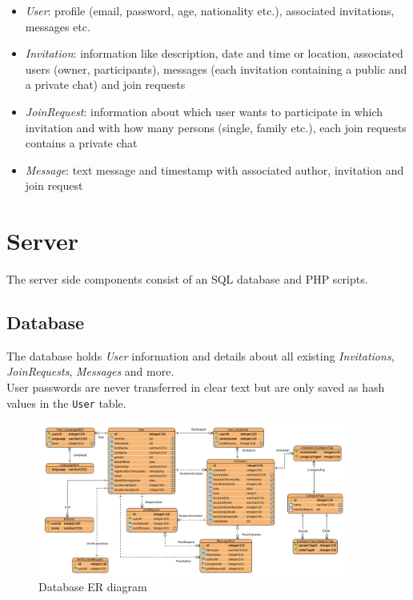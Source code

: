 \documentclass[12pt]{scrartcl}
\begin{document}
\begin{itemize}
	\item \emph{User}: profile (email, password, age, nationality etc.), associated invitations, messages etc.
	\item \emph{Invitation}: information like description, date and time or location, associated users (owner, participants), messages (each invitation containing a public and a private chat) and join requests
	\item \emph{JoinRequest}: information about which user wants to participate in which invitation and with how many persons (single, family etc.), each join requests contains a private chat
	\item \emph{Message}: text message and timestamp with associated author, invitation and join request
\end{itemize}

\newpage
\section{Server}

The server side components consist of an SQL database and PHP scripts.

\subsection{Database}

The database holds \emph{User} information and details about all existing \emph{Invitations}, \emph{JoinRequests}, \emph{Messages} and more.\\
User passwords are never transferred in clear text but are only saved as hash values in the \texttt{User} table.

\begin{figure}[h]
	\begin{center}
		\includegraphics[width=0.9\textwidth]{../../spec/components/database_ER.png}
		\caption[Database ER diagram]{Database ER diagram}
		\label{fig:database-ER}
	\end{center}
\end{figure}
\end{document}
